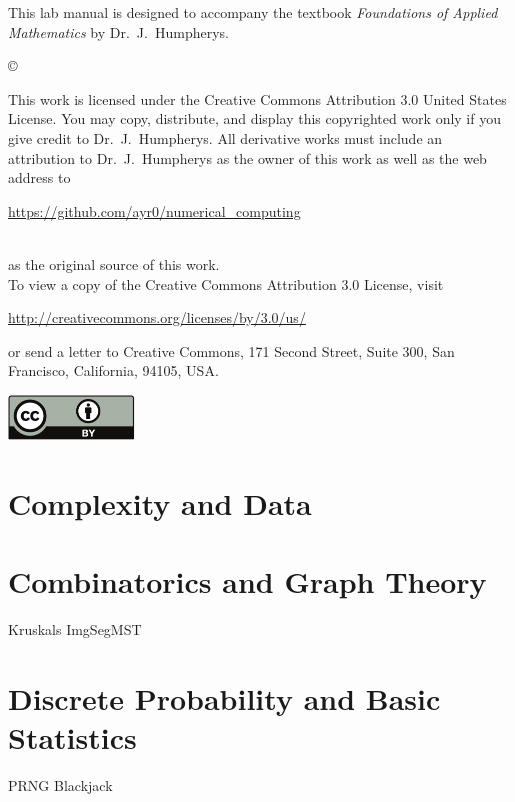 \documentclass{newsiambook}
\begin{document}

\begin{thepreface}
This lab manual is designed to accompany the textbook \emph{Foundations of Applied Mathematics} by Dr.~J.~Humpherys.

\vfill
\copyright{This work is licensed under the Creative Commons Attribution 3.0 United States
License.  You may copy, distribute, and display this copyrighted work only if you give
credit to Dr.~J.~Humpherys. All derivative works must include an attribution to Dr.~J.~Humpherys as the owner of this work as well as the web address to
\\\centerline{\url{https://github.com/ayr0/numerical_computing}}\\ as the original source of
this
work.\\To view a copy of the Creative Commons Attribution 3.0 License,
visit\\\centerline{\url{http://creativecommons.org/licenses/by/3.0/us/}} or send a letter to
Creative Commons, 171 Second Street, Suite 300, San Francisco, California, 94105, USA.}

\vfill
\centering\includegraphics[height=1.2cm]{by}
\vfill
\end{thepreface}

\setcounter{tocdepth}{1}
\tableofcontents

\mainmatter

\part{Complexity and Data}

\part{Combinatorics and Graph Theory}
{Kruskals}
{ImgSegMST}

\part{Discrete Probability and Basic Statistics}
{PRNG}
{Blackjack}
\end{document}
